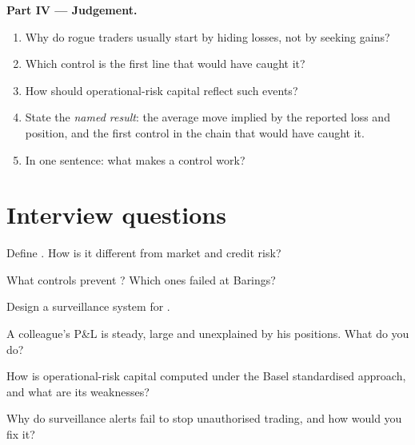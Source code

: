 \begin{problem}
\medskip\noindent\textbf{Part IV --- Judgement.}
\begin{enumerate}[resume]
\item Why do rogue traders usually start by hiding losses, not by seeking gains?
\item Which control is the first line that would have caught it?
\item How should operational-risk capital reflect such events?
\item State the \emph{named result}: the average move implied by the reported loss and position, and the
first control in the chain that would have caught it.
\item In one sentence: what makes a control work?
\end{enumerate}
\end{problem}

\section{Interview questions}

\begin{interviewq}\label{iq:rc:operational-risk-and-rogue-trading:1}
Define . How is it different from market and credit risk?
\end{interviewq}

\begin{interviewq}\label{iq:rc:operational-risk-and-rogue-trading:2}
What controls prevent ? Which ones failed at Barings?
\end{interviewq}

\begin{interviewq}\label{iq:rc:operational-risk-and-rogue-trading:3}
Design a surveillance system for .
\end{interviewq}

\begin{interviewq}\label{iq:rc:operational-risk-and-rogue-trading:4}
A colleague's P\&L is steady, large and unexplained by his positions. What do you do?
\end{interviewq}

\begin{interviewq}\label{iq:rc:operational-risk-and-rogue-trading:5}
How is operational-risk capital computed under the Basel standardised approach, and what are its weaknesses?
\end{interviewq}

\begin{interviewq}\label{iq:rc:operational-risk-and-rogue-trading:6}
Why do surveillance alerts fail to stop unauthorised trading, and how would you fix it?
\end{interviewq}
